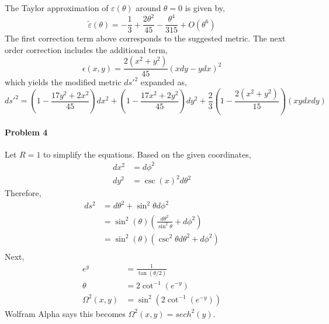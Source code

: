 \documentclass[12pt]{scrartcl}
\begin{document}
The Taylor approximation of $\varepsilon(\theta)$ around $\theta = 0$ is given by,
\[\tilde{\varepsilon}(\theta) = -\frac{1}{3} + \frac{2\theta^2}{45} - \frac{\theta^4}{315} + O(\theta^6)\]
The first correction term above corresponds to the suggested metric.  The next order correction includes the additional term,
\[\epsilon(x, y) = \frac{2(x^2 + y^2)}{45}(x dy - y dx)^2\] 
which yields the modified metric $ds'^2$ expanded as,
\[ds'^2 = \left(1 - \frac{17 y^2 + 2 x^2}{45}\right)dx^2 + \left(1 - \frac{17 x^2 + 2 y^2}{45}\right)dy^2 + \frac{2}{3}\left(1 - \frac{2(x^2 + y^2)}{15}\right)(x y dx dy)\]
 
\paragraph{Problem 4}
Let $R=1$ to simplify the equations. Based on the given coordinates,
\begin{align*}
	dx^2 &= d\phi^2 \\
	dy^2 &= \csc(x)^2 d\theta^2
\end{align*}
Therefore,
\begin{align*}
	ds^2 &= d\theta^2 + \sin^2\theta d\phi^2 \\
	&= \sin^2(\theta)\left(\frac{d\theta^2}{\sin^2{\theta}} + d\phi^2\right) \\
	&=  \sin^2(\theta)(\csc^2\theta d\theta^2 + d\phi^2) \\
\end{align*}
Next,
\begin{align*}
	e^{y} &= \frac{1}{\tan{(\theta/2)}}\\
	\theta &= 2\cot^{-1}(e^{-y})\\
	\Omega^2(x, y) &= \sin^2\left(2\cot^{-1}(e^{-y})\right)
\end{align*}
Wolfram Alpha says this becomes $\Omega^2(x, y) = sech^2(y)$.
\end{document}
